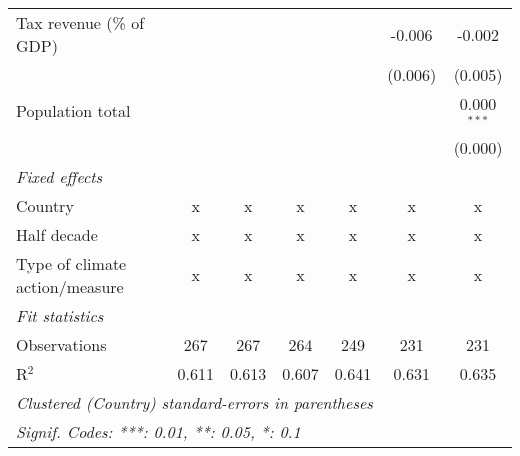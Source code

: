 \begin{tabular}{lcccccc}
   Tax revenue (\% of GDP)              &              &               &              &              & -0.006       & -0.002\\   
                                        &              &               &              &              & (0.006)      & (0.005)\\   
   Population total                     &              &               &              &              &              & 0.000$^{***}$\\   
                                        &              &               &              &              &              & (0.000)\\   
   \emph{Fixed effects}\\
   Country                              & x            & x             & x            & x            & x            & x\\  
   Half decade                          & x            & x             & x            & x            & x            & x\\  
   Type of climate action/measure       & x            & x             & x            & x            & x            & x\\  
   \midrule \emph{Fit statistics}\\
   Observations                         & 267          & 267           & 264          & 249          & 231          & 231\\  
   R$^2$                                & 0.611        & 0.613         & 0.607        & 0.641        & 0.631        & 0.635\\  
   \midrule
   \multicolumn{7}{l}{\emph{Clustered (Country) standard-errors in parentheses}}\\
   \multicolumn{7}{l}{\emph{Signif. Codes: ***: 0.01, **: 0.05, *: 0.1}}\\
\end{tabular}
\par\endgroup


